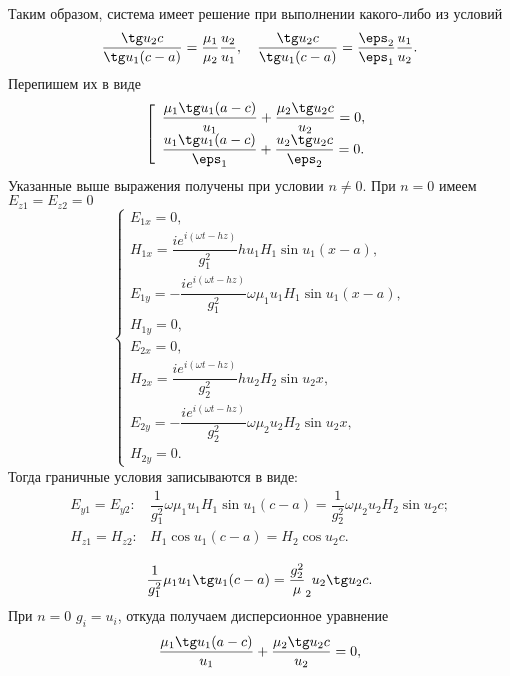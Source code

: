 \documentclass[12pt]{hedsemwork}
\renewcommand{\frac}{\dfrac}
\begin{document}
Таким образом, система имеет решение при выполнении какого-либо из условий
\[
    \frac{\tg u_2 c}{\tg u_1 (c-a)} =
    \frac{\mu_1}{\mu_2}\frac{u_2}{u_1},\quad
    \frac{\tg u_2 c}{\tg u_1 (c-a)} =
    \frac{\eps_2}{\eps_1}\frac{u_1}{u_2}.
\]
Перепишем их в виде
\[
    \left[
        \begin{array}{l}
            \frac{\mu_1\tg u_1 (a-c)}{u_1} + \frac{\mu_2\tg u_2 c}{u_2} = 0,\\
            \frac{u_1\tg u_1 (a-c)}{\eps_1} + \frac{u_2\tg u_2 c}{\eps_2} = 0.
        \end{array}
    \right.
\]
Указанные выше выражения получены при условии \( n \neq 0 \). При \( n = 0 \)
имеем \( E_{z1} = E_{z2} = 0 \)
\[
    \left\{
    \begin{array}{l}
        E_{1x} = 0, \\
        H_{1x} = \frac{i e^{i(\omega t - h z)}}{g_1^2}
        h u_1 H_1 \sin u_1 (x-a),\\
        E_{1y} = -\frac{i e^{i(\omega t - h z)}}{g_1^2}
        \omega\mu_1u_1H_1 \sin u_1 (x-a),\\
        H_{1y} = 0,\\
        E_{2x} = 0,\\
        H_{2x} = \frac{i e^{i(\omega t - h z)}}{g_2^2}
        h u_2 H_2 \sin u_2 x,\\
        E_{2y} = -\frac{i e^{i(\omega t - h z)}}{g_2^2}
        \omega\mu_2u_2H_2 \sin u_2 x,\\
        H_{2y} = 0.
    \end{array}
    \right.
\]
Тогда граничные условия записываются в виде:
\[
\begin{array}{cl}
    E_{y1} = E_{y2}: &
    \frac{1}{g_1^2}  \omega\mu_1u_1H_1 \sin u_1 (c-a) =
    \frac{1}{g_2^2}  \omega\mu_2u_2H_2 \sin u_2 c ;\\
    H_{z1} = H_{z2}: & H_1\cos u_1 (c-a) = H_2\cos u_2 c.\\
\end{array}
\]
\[
    \frac{1}{g_1^2} \mu_1 u_1 \tg u_1 (c-a) = \frac{g_2^2} \mu_2 u_2 \tg u_2 c.
\]
При \( n=0 \) \( g_i = u_i \), откуда получаем дисперсионное уравнение
\[
    \frac{\mu_1\tg u_1 (a-c)}{u_1} + \frac{\mu_2\tg u_2 c}{u_2} = 0,
\]
\end{document}
